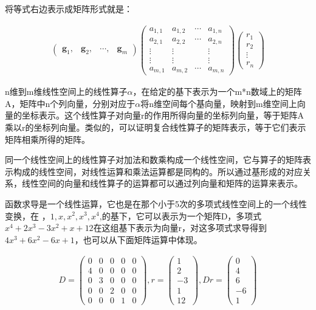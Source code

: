 将等式右边表示成矩阵形式就是：

\begin{gather*}
	\begin{pmatrix}\textbf{g}_1,& \textbf{g}_2,& \cdots,& \textbf{g}_m \end{pmatrix}\begin{pmatrix} a_{1,1}& a_{1,2}&\cdots& a_{1,n} \\ a_{2,1}& a_{2,2}&\cdots& a_{2,n} \\ \vdots& \vdots & \ &\vdots \\ \vdots& \vdots & \ &\vdots  \\a_{m,1}& a_{m,2} &\cdots& a_{m,n} \end{pmatrix} \begin{pmatrix}r_1 \\r_2 \\ \vdots \\r_n \end{pmatrix}
\end{gather*}

n维到m维线性空间上的线性算子$ \alpha $，在给定的基下表示为一个m*n数域上的矩阵A，矩阵中n个列向量，分别对应于$ \alpha $将n维空间每个基向量，映射到m维空间上向量的坐标表示。这个线性算子对向量r的作用所得向量的坐标列向量，等于矩阵A乘以r的坐标列向量。类似的，可以证明复合线性算子的矩阵表示，等于它们表示矩阵相乘所得的矩阵。

同一个线性空间上的线性算子对加法和数乘构成一个线性空间，它与算子的矩阵表示构成的线性空间，对线性运算和乘法运算都是同构的。所以通过基形成的对应关系，线性空间的向量和线性算子的运算都可以通过列向量和矩阵的运算来表示。

\kaishu

函数求导是一个线性运算，它也是在那个小于5次的多项式线性空间上的一个线性变换，在 ，$ 1, x, x^2, x^3,  x^4 $,的基下，它可以表示为一个矩阵D，多项式$ x^4+2x^3-3x^2+x+12 $在这组基下表示为向量r，对这多项式求导得到$ 4x^3+6x^2-6x+1 $，也可以从下面矩阵运算中体现。

\begin{gather*}
	D=\begin{pmatrix}0&0&0&0&0\\4&0&0&0&0\\0&3&0&0&0\\0&0&2&0&0\\0&0&0&1&0 \end{pmatrix},r=\begin{pmatrix}1\\2\\-3\\1\\12\end{pmatrix},  Dr=\begin{pmatrix}0\\4\\6\\-6\\1\end{pmatrix}
\end{gather*}


